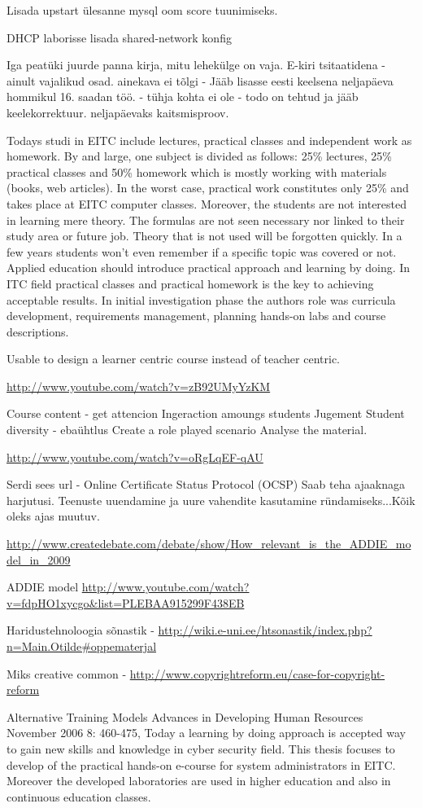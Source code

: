 Lisada upstart ülesanne mysql oom score tuunimiseks.


DHCP laborisse lisada shared-network konfig

Iga peatüki juurde panna kirja, mitu lehekülge on vaja.
E-kiri tsitaatidena - ainult vajalikud osad.
ainekava ei tõlgi - Jääb lisasse eesti keelsena
neljapäeva hommikul 16. saadan töö. - tühja kohta ei ole - todo on tehtud ja jääb keelekorrektuur.
neljapäevaks kaitsmisproov.

 Todays studi in \gls{EITC} include lectures, practical classes and independent work as homework. By and large, one subject is divided as follows: 25\% lectures, 25\% practical classes and 50\% homework which is mostly working with materials (books, web articles). In the worst case, practical work constitutes only 25\% and takes place at \gls{EITC} computer classes.
Moreover, the students are not interested in learning mere theory. The formulas are not seen necessary nor linked to their study area or future job. Theory that is not used will be forgotten quickly. In a few years students won't even remember if a specific topic was covered or not. Applied education should introduce practical approach and learning by doing. In ITC field practical classes and practical homework is the key to achieving acceptable results.
In initial investigation phase the authors role was curricula development, requirements management,  planning hands-on labs and course descriptions.

{\color{red} 
Usable to design a learner centric course instead of teacher centric. 

\url{http://www.youtube.com/watch?v=zB92UMyYzKM}

Course content - get attencion
Ingeraction amoungs students
Jugement 
Student diversity - ebaühtlus
Create a role played scenario
Analyse the material.

\url{http://www.youtube.com/watch?v=oRgLqEF-qAU}

}

Serdi sees url -  Online Certificate Status Protocol (OCSP)
Saab teha ajaaknaga harjutusi. Teenuste uuendamine ja uure vahendite kasutamine ründamiseks...Kõik oleks ajas muutuv.

\url{http://www.createdebate.com/debate/show/How_relevant_is_the_ADDIE_model_in_2009}

ADDIE model \url{http://www.youtube.com/watch?v=fdpHO1xycgo&list=PLEBAA915299F438EB}


Haridustehnoloogia sõnastik - \url{http://wiki.e-uni.ee/htsonastik/index.php?n=Main.Otilde#oppematerjal}

Miks creative common - \url{http://www.copyrightreform.eu/case-for-copyright-reform}

Alternative Training Models
Advances in Developing Human Resources November 2006 8: 460-475,
Today a learning by doing approach is accepted way to gain new skills and knowledge in cyber security field. This thesis focuses to develop of the practical hands-on e-course for system administrators in \gls{EITC}. Moreover the developed laboratories are used in higher education and also in continuous education classes.

%